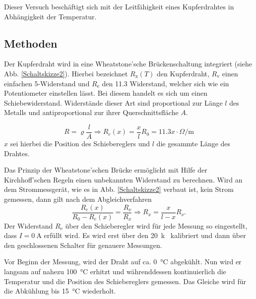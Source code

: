 \documentclass[11pt,a4paper,titlepage, ngerman]{article}
\begin{document}
		Dieser Versuch beschäftigt sich mit der Leitfähigkeit eines Kupferdrahtes in Abhängigkeit der Temperatur.
		
		\subsection{Methoden} 
		
			Der Kupferdraht wird in eine Wheatstone'sche Brückenschaltung integriert (siehe Abb. \ref{Schaltskizze2}). Hierbei bezeichnet $R_\text{x}(T)$ den Kupferdraht, $R_\text{v}$ einen einfachen \SI{5}{\Omega}-Widerstand und $R_\text{e}$ den \SI{11,3}{\Omega} Widerstand, welcher sich wie ein Potentiometer einstellen lässt. Bei diesem handelt es sich um einen Schiebewiderstand. Widerstände dieser Art sind proportional zur Länge $l$ des Metalls und antiproportional zur ihrer Querschnittsfläche $A$. 
			
			\begin{equation*}
				R = \varrho \frac{l}{A} \Rightarrow R_e(x) = \frac{x}{l} R_0 = \SI{11,3} x \cdot \si{\Omega\per\meter}
			\end{equation*}				
			$x$ sei hierbei die Position des Schiebereglers und $l$ die gesammte Länge des Drahtes.	
			
			Das Prinzip der Wheatstone'schen Brücke ermöglicht mit Hilfe der Kirchhoff'schen Regeln einen unbekannten Widerstand zu berechnen.
			Wird an dem Strommessgerät, wie es in Abb. \ref{Schaltskizze2} verbaut ist, kein Strom gemessen, dann gilt nach dem Abgleichverfahren
			\begin{equation*}
				\frac{R_e(x)}{R_0-R_e(x)} = \frac{R_\nu}{R_x} \Rightarrow R_x = \frac{x}{l-x} R_\nu.
			\end{equation*}
			Der Widerstand $R_\text{e}$ über den Schieberegler wird für jede Messung so eingestellt, dass $I = \SI{0}{\A}$ erfüllt wird. Es wird erst über den \SI{20}{k\Omega} kalibriert und dann über den geschlossenen Schalter für genauere Messungen.
			
			Vor Beginn der Messung, wird der Draht auf ca. \SI{0}{\celsius} abgekühlt.
			Nun wird er langsam auf nahezu \SI{100}{\celsius} erhitzt und währenddessen kontinuierlich die Temperatur und die Position des Schiebereglers gemessen.
			Das Gleiche wird für die Abkühlung bis \SI{15}{\celsius} wiederholt.
						
\end{document}
